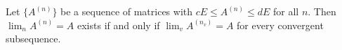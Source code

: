 Let $\{A^{(n)}\}$ be a sequence of matrices with $cE \leq A^{(n)} \leq dE$ for all $n$. Then $\lim_n A^{(n)} = A$ exists if and only if $\lim_v A^{(n_v)} = A$ for every convergent subsequence.
